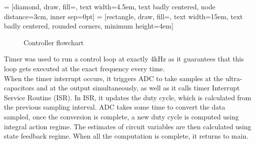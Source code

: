  = [diamond, draw, fill=\myblue, 
    text width=4.5em, text badly centered, node distance=3cm, inner sep=0pt]
 = [rectangle, draw, fill=\myblue, 
    text width=15em, text badly centered, rounded corners, minimum height=4em]
\begin{figure}[H]
    \centering
    \caption{Controller flowchart}
    \label{flow:timerISR}
\end{figure}

Timer was used to run a control loop at exactly 4kHz as it guarantees that this loop gets executed at the exact frequency every time. \\

When the timer interrupt occurs, it triggers ADC to take samples at the ultra-capacitors and at the output simultaneously, as well as it calls timer Interrupt Service Routine (ISR). In ISR, it updates the duty cycle, which is calculated from the previous sampling interval. ADC takes some time to convert the data sampled, once the conversion is complete, a new duty cycle is computed using integral action regime. The estimates of circuit variables are then calculated using state feedback regime. When all the computation is complete, it returns to main. \\


